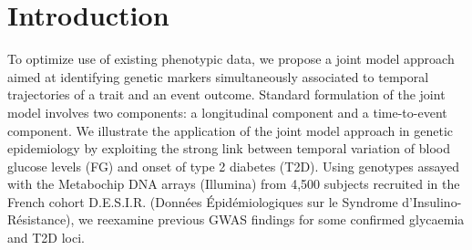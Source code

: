 \documentclass[a0,portrait]{a0poster}
\begin{document}




\color{SaddleBrown}
\section*{Introduction}
\par{To optimize use of existing phenotypic data, we propose a joint model \citep{tsiatis2004} approach aimed at identifying genetic markers
simultaneously associated to temporal trajectories of a trait and an event outcome.
Standard formulation of the joint model involves two components: a longitudinal component and a time-to-event component.
We illustrate the application of the joint model approach in genetic epidemiology by exploiting the strong link
between temporal variation of blood glucose levels (FG) and onset of type 2 diabetes (T2D).
Using genotypes assayed with the Metabochip DNA arrays (Illumina) from 4,500 subjects recruited
in the French cohort D.E.S.I.R. (Donn\'{e}es \'{E}pid\'{e}miologiques sur le Syndrome d’Insulino-R\'{e}sistance),
we reexamine previous GWAS findings for some confirmed glycaemia and T2D loci.}
\end{document}
